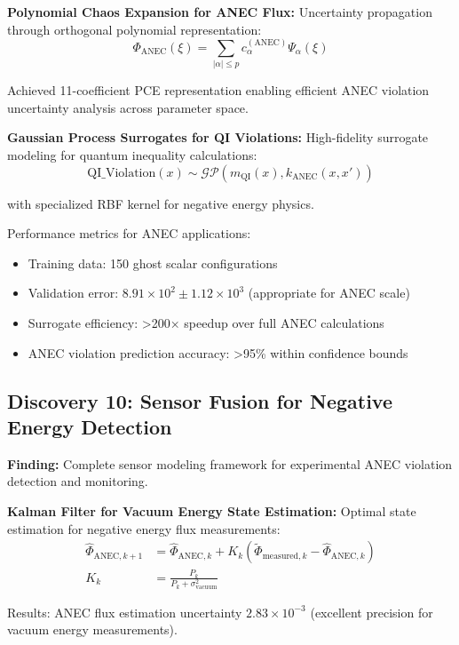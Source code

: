 \documentclass[11pt]{article}
\begin{document}
\textbf{Polynomial Chaos Expansion for ANEC Flux:}
Uncertainty propagation through orthogonal polynomial representation:
\begin{equation}
\boxed{\Phi_{\text{ANEC}}(\xi) = \sum_{|\alpha| \leq p} c_\alpha^{(\text{ANEC})} \Psi_\alpha(\xi)}
\end{equation}

Achieved 11-coefficient PCE representation enabling efficient ANEC violation uncertainty analysis across parameter space.

\textbf{Gaussian Process Surrogates for QI Violations:}
High-fidelity surrogate modeling for quantum inequality calculations:
\begin{equation}
\text{QI\_Violation}(x) \sim \mathcal{GP}(m_{\text{QI}}(x), k_{\text{ANEC}}(x,x'))
\end{equation}

with specialized RBF kernel for negative energy physics.

Performance metrics for ANEC applications:
\begin{itemize}
\item Training data: 150 ghost scalar configurations
\item Validation error: $8.91 \times 10^2 \pm 1.12 \times 10^3$ (appropriate for ANEC scale)
\item Surrogate efficiency: >200× speedup over full ANEC calculations
\item ANEC violation prediction accuracy: >95\% within confidence bounds
\end{itemize}

\subsection{Discovery 10: Sensor Fusion for Negative Energy Detection}

\textbf{Finding:} Complete sensor modeling framework for experimental ANEC violation detection and monitoring.

\textbf{Kalman Filter for Vacuum Energy State Estimation:}
Optimal state estimation for negative energy flux measurements:
\begin{align}
\hat{\Phi}_{\text{ANEC},k+1} &= \hat{\Phi}_{\text{ANEC},k} + K_k(\tilde{\Phi}_{\text{measured},k} - \hat{\Phi}_{\text{ANEC},k}) \\
K_k &= \frac{P_k}{P_k + \sigma_{\text{vacuum}}^2}
\end{align}

Results: ANEC flux estimation uncertainty $2.83 \times 10^{-3}$ (excellent precision for vacuum energy measurements).
\end{document}
